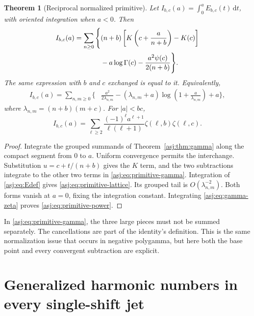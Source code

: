 \documentclass[11pt]{article}
\numberwithin{equation}{section}
\newtheorem{theorem}{Theorem}[section]
\theoremstyle{definition}\newtheorem{definition}[theorem]{Definition}
\theoremstyle{remark}\newtheorem{remark}[theorem]{Remark}\newtheorem{example}[theorem]{Example}
\newcommand{\dd}{\,\mathrm d}\newcommand{\Rea}{\operatorname{Re}}
\begin{document}
\begin{theorem}[Reciprocal normalized primitive]\label{asj:thm:primitive}
Let $I_{b,c}(a)=\int_0^a E_{b,c}(t)\dd t$, with oriented integration
when $a<0$. Then
\begin{align}\label{asj:eq:primitive-gamma}
 I_{b,c}(a)=\sum_{n\ge0}\Bigg\{&(n+b)
              \left[K\left(c+\frac a{n+b}\right)-K(c)\right]\notag\\
              &-a\log\Gamma(c)-\frac{a^2\psi(c)}{2(n+b)}\Bigg\}.
\end{align}
The same expression with $b$ and $c$ exchanged is equal to it. Equivalently,
\begin{align}\label{asj:eq:primitive-lattice}
 I_{b,c}(a)=\sum_{n,m\ge0}\Bigg\{&\frac{a^2}{2\lambda_{n,m}}
        -(\lambda_{n,m}+a)
                 \log\left(1+\frac a{\lambda_{n,m}}\right)+a\Bigg\},
\end{align}
where $\lambda_{n,m}=(n+b)(m+c)$. For $|a|<bc$,
\begin{equation}\label{asj:eq:primitive-power}
 I_{b,c}(a)=\sum_{\ell\ge2}\frac{(-1)^\ell a^{\ell+1}}{\ell(\ell+1)}
                                   \zeta(\ell,b)\zeta(\ell,c).
\end{equation}
\end{theorem}
\begin{proof}
Integrate the grouped summands of Theorem~\ref{asj:thm:gamma} along the
compact segment from $0$ to $a$. Uniform convergence permits the
interchange. Substitution $u=c+t/(n+b)$ gives the $K$ term, and the
two subtractions integrate to the other two terms in
\eqref{asj:eq:primitive-gamma}. Integration of \eqref{asj:eq:Edef} gives
\eqref{asj:eq:primitive-lattice}. Its grouped tail is $O(\lambda_{n,m}^{-2})$.
Both forms vanish at $a=0$, fixing the integration constant. Integrating
\eqref{asj:eq:gamma-zeta} proves \eqref{asj:eq:primitive-power}.
\end{proof}

In \eqref{asj:eq:primitive-gamma}, the three large pieces must not be summed
separately. The cancellations are part of the identity's definition.
This is the same normalization issue that occurs in negative polygamma,
but here both the base point and every convergent subtraction are explicit.



\section{Generalized harmonic numbers in every single-shift jet}
\label{asj:sec:harmonic}
\end{document}
